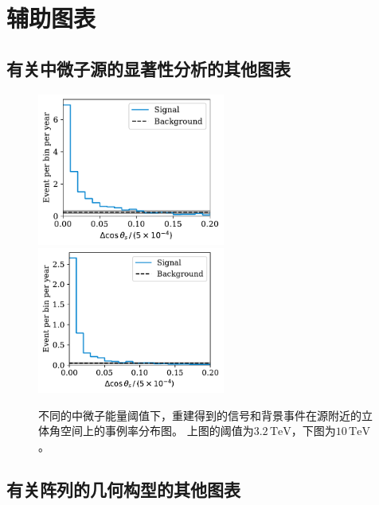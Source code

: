 \chapter{辅助图表}

\section{有关中微子源的显著性分析的其他图表}
\label{appendix:sensitivity_plots}

\begin{figure}[!htb]%
    \centering
    \includegraphics[width=0.55\textwidth]{img/event_rate_around_source_3.2TeV.pdf}
    \includegraphics[width=0.55\textwidth]{img/event_rate_around_source_10TeV.pdf}
    \caption{
    不同的中微子能量阈值下，重建得到的信号和背景事件在源附近的立体角空间上的事例率分布图。
    上图的阈值为$3.2\,\mathrm{TeV}$，下图为$10\,\mathrm{TeV}$。
    }
    \label{fig:event_rate_around_source_energy_threshold}
\end{figure}

\section{有关阵列的几何构型的其他图表}
\label{appendix:geometry_plot}


